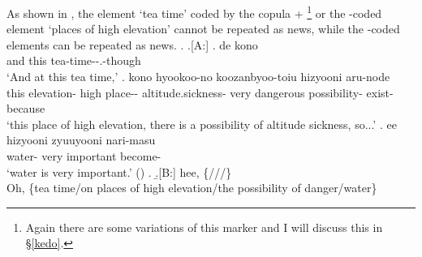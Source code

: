 %
As shown in \Next,
the element  `tea time' coded by the copula + %
	\footnote{
	Again there are some variations of this marker
	and I will discuss this in \S \ref{kedo}.
	}
or the -coded element  `places of high elevation'
cannot be repeated as news,
while the -coded elements can be repeated as news.
%
\ex. \a.[A:] \ag. de kono  \\
		and this tea-time--.-though \\
		`And at this tea time,'
	\bg. kono hyookoo-no   koozanbyoo-toiu hizyooni   aru-node \\
		this elevation- high place-- altitude.sickness- very dangerous possibility- exist-because \\
		`this place of high elevation, there is a possibility of altitude sickness, so...'
	\bg. ee  hizyooni zyuuyooni nari-masu \\
		 water- very important become- \\
		`water is very important.'
		 \hfill{()}
	\z.
\b.[B:] hee, \{///\} \\
	Oh, \{tea time/on places of high elevation/the possibility of danger/water\}


%
%
%
%

